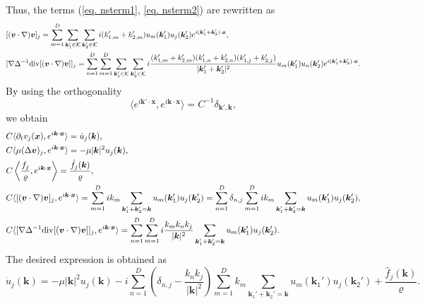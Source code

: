 \documentclass[a4paper,11pt,fleqn]{article}
\begin{document}
Thus, the terms (\ref{eq. nsterm1}, \ref{eq. nsterm2}) are rewritten as 
\begin{align}
    &[({\bm v}\cdot \nabla){\bm v}]_j =  \sum_{m=1}^D\sum_{{\bm k}_1'\in \mathcal{K}}\sum_{{\bm k}_2'\in \mathcal{K}} i(k_{1,m}'+k_{2,m}') u_m({\bm k}_1')u_j({\bm k}_2')e^{i({\bm k}_1'+{\bm k}_2')\cdot{\bm x}}, \\
    &[\nabla \Delta^{-1}{\rm div}[({\bm v}\cdot \nabla){\bm v}]]_j = \sum_{n=1}^D\sum_{m=1}^D\sum_{{\bm k}_1'\in \mathcal{K}}\sum_{{\bm k}_2'\in \mathcal{K}} i\frac{(k_{1,m}'+k_{2,m}')(k_{1,n}'+k_{2,n}')(k_{1,j}'+k_{2,j}')}{|{\bm k}_1' + {\bm k}_2'|^2} u_m({\bm k}_1')u_n({\bm k}_2')e^{i({\bm k}_1'+{\bm k}_2')\cdot{\bm x}}.
\end{align}
By using the orthogonality
\begin{equation}
    \langle e^{i{\bm k}'\cdot{\bm x}},e^{i{\bm k}\cdot{\bm x}}  \rangle = C^{-1} \delta_{{\bm k}',{\bm k}}, 
\end{equation}
we obtain 
\begin{align}
    &C\langle \partial_t v_j({\bm x}), e^{i{\bm k}\cdot{\bm x}}  \rangle  = \dot{u}_j({\bm k}), \\
    &C\langle \mu (\Delta {\bm v})_j, e^{i{\bm k}\cdot{\bm x}}  \rangle  =-\mu|{\bm k}|^2 u_j({\bm k}), \\
    &C\left\langle \frac{f_j}{\varrho}, e^{i{\bm k}\cdot{\bm x}}  \right\rangle  =\frac{\hat{f}_j({\bm k})}{\varrho}, \\
    &C\langle [({\bm v}\cdot \nabla){\bm v}]_j, e^{i{\bm k}\cdot{\bm x}}  \rangle  = \sum_{m=1}^D ik_m\sum_{{\bm k}_1'+{\bm k}_2' = {\bm k}}u_m({\bm k}_1')u_j({\bm k}_2') = \sum_{n=1}^D \delta_{n,j} \sum_{m=1}^D ik_m\sum_{{\bm k}_1'+{\bm k}_2' = {\bm k}}u_m({\bm k}_1')u_j({\bm k}_2'),\\
    &C\langle [\nabla \Delta^{-1}{\rm div}[({\bm v}\cdot \nabla){\bm v}]]_j, e^{i{\bm k}\cdot{\bm x}}  
    \rangle = \sum_{n=1}^D\sum_{m=1}^D i\frac{k_m k_n k_j}{|{\bm k}|^2}  \sum_{{\bm k}_1'+{\bm k}_2' = {\bm k}}u_m({\bm k}_1')u_j({\bm k}_2').
\end{align}
The desired expression is obtained as 
\begin{equation}
    \dot{u}_j({\bm k}) = -\mu|{\bm k}|^2 u_j({\bm k}) - i\sum_{n=1}^D \left(\delta_{n,j} - \frac{k_n k_j}{|{\bm k}|^2} \right) \sum_{m=1}^D k_m\sum_{{\bm k}_1'+{\bm k}_2' = {\bm k}}u_m({\bm k}_1')u_j({\bm k}_2')+\frac{\hat{f}_j({\bm k})}{\varrho}.
\end{equation}
\end{document}
